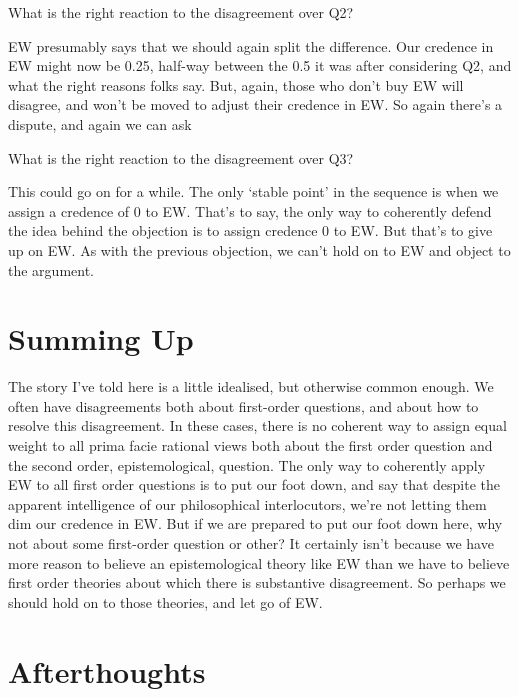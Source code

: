\documentclass[
  10pt,
  letterpaper,
  DIV=11,
  numbers=noendperiod,
  twoside]{scrartcl}
\providecommand{\tightlist}{%
  \setlength{\itemsep}{0pt}\setlength{\parskip}{0pt}}\usepackage{longtable,booktabs,array}
\begin{document}
\begin{description}
\tightlist
\item[Q3]
What is the right reaction to the disagreement over Q2?
\end{description}

EW presumably says that we should again split the difference. Our
credence in EW might now be 0.25, half-way between the 0.5 it was after
considering Q2, and what the right reasons folks say. But, again, those
who don't buy EW will disagree, and won't be moved to adjust their
credence in EW. So again there's a dispute, and again we can ask

\begin{description}
\tightlist
\item[Q4]
What is the right reaction to the disagreement over Q3?
\end{description}

This could go on for a while. The only `stable point' in the sequence is
when we assign a credence of 0 to EW. That's to say, the only way to
coherently defend the idea behind the objection is to assign credence 0
to EW. But that's to give up on EW. As with the previous objection, we
can't hold on to EW and object to the argument.

\section{Summing Up}\label{summing-up}

The story I've told here is a little idealised, but otherwise common
enough. We often have disagreements both about first-order questions,
and about how to resolve this disagreement. In these cases, there is no
coherent way to assign equal weight to all prima facie rational views
both about the first order question and the second order,
epistemological, question. The only way to coherently apply EW to all
first order questions is to put our foot down, and say that despite the
apparent intelligence of our philosophical interlocutors, we're not
letting them dim our credence in EW. But if we are prepared to put our
foot down here, why not about some first-order question or other? It
certainly isn't because we have more reason to believe an
epistemological theory like EW than we have to believe first order
theories about which there is substantive disagreement. So perhaps we
should hold on to those theories, and let go of EW.

\section*{Afterthoughts}\label{afterthoughts}
\end{document}
